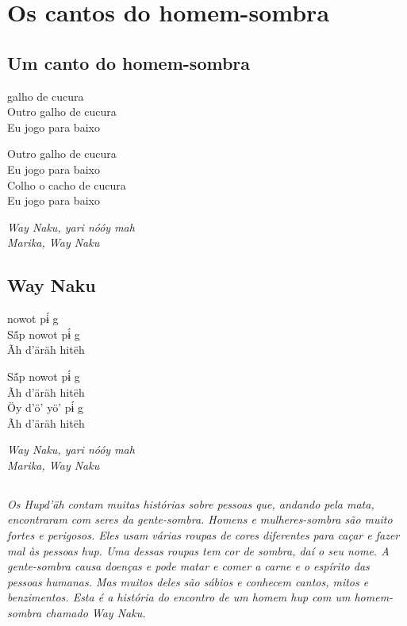 \part{Os cantos do homem-sombra}

\openany

{\pagecolor{black}
\color{white}
\chapter*{Um canto do homem-sombra}

 galho de cucura\\
Outro galho de cucura\\
Eu jogo para baixo

\bigskip

\noindent Outro galho de cucura\\
Eu jogo para baixo\\
Colho o cacho de cucura\\
Eu jogo para baixo

\bigskip

\noindent \textit{Way Naku, yari nóóy mah\\
Marika, Way Naku}

\chapter*{Way Naku}

 nowot pɨ́ g\\
Sã́p nowot pɨ́ g\\
Ãh d’äräh hitëh

\bigskip

\noindent Sã́p nowot pɨ́ g\\
Ãh d’äräh hitëh\\
Öy d’ö’ yö’ pɨ́ g\\
Ãh d’äräh hitëh

\bigskip

\noindent \textit{Way Naku, yari nóóy mah\\
Marika, Way Naku}
\afterpage{\nopagecolor}}

\chapter*{}
\thispagestyle{empty}

\vspace*{\fill}
\textit{Os Hupd'äh contam muitas histórias sobre pessoas que, andando pela mata, encontraram com seres da gente-sombra. Homens e mulheres-sombra são muito fortes e perigosos. Eles usam várias roupas de cores diferentes para caçar e fazer mal às pessoas hup. Uma dessas roupas tem cor de sombra, daí o seu nome. A gente-sombra causa doenças e pode matar e comer a carne e o espírito das pessoas humanas. Mas muitos deles são sábios e conhecem cantos, mitos e benzimentos. Esta é a história do encontro de um homem hup com um homem-sombra chamado Way Naku.}
\vspace*{\fill}


